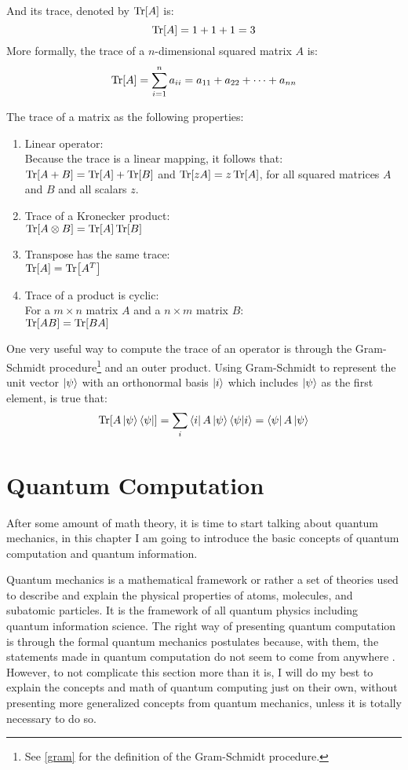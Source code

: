 And its trace, denoted by $\Tr[A]$ is:
$$
\Tr[A] = 1 + 1 + 1 = 3
$$
More formally, the trace of a $n$-dimensional squared matrix $A$ is:
$$
\Tr[A] = \sum_{i=1}^{n} a_{ii} = a_{11} + a_{22} + \cdots + a_{nn}
$$


The trace of a matrix as the following properties:
\begin{enumerate}
	\item Linear operator: \\
	Because the trace is a linear mapping, it follows that:\\
	$\Tr[A+B] = \Tr[A] + \Tr[B]$ and $\Tr[zA] = z \Tr[A]$, for all squared matrices $A$ and $B$ and all scalars $z$.
	\item Trace of a Kronecker product: \\
	$\Tr[A \otimes B] = \Tr[A]\Tr[B]$
	\item Transpose has the same trace: \\
	$\Tr[A]=\Tr[A^T]$
	\item Trace of a product is cyclic: \\
	For a $m \times n$ matrix $A$ and a $n \times m$ matrix $B$:\\
	$\Tr[AB]=\Tr[BA]$
\end{enumerate}

One very useful way to compute the trace of an operator is through the Gram-Schmidt procedure\footnote{See \ref{gram} for the definition of the Gram-Schmidt procedure.} and an outer product. 
Using Gram-Schmidt to represent the unit vector $\ket{\psi}$ with an orthonormal basis $\ket{i}$ which includes $\ket{\psi}$ as the first element, is true that:
$$
\Tr[A\ket{\psi}\bra{\psi}] = \sum_i \bra{i}A\ket{\psi}\bra{\psi}\ket{i} = \bra{\psi}A\ket{\psi}
$$

\chapter{Quantum Computation}
After some amount of math theory, it is time to start talking about quantum mechanics, in this chapter I am going to introduce the basic concepts of quantum computation and quantum information.

Quantum mechanics is a mathematical framework or rather a set of theories used to describe and explain the physical properties of atoms, molecules, and subatomic particles. It is the framework of all quantum physics including quantum information science. The right way of presenting quantum computation is through the formal quantum mechanics postulates because, with them, the statements made in quantum computation do not seem to come from anywhere \cite{QCandQI:QM_postulates}. However, to not complicate this section more than it is, I will do my best to explain the concepts and math of quantum computing just on their own, without presenting more generalized concepts from quantum mechanics, unless it is totally necessary to do so.

